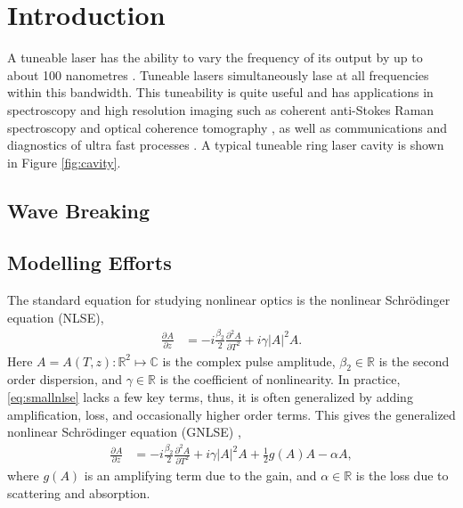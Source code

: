 \documentclass[10pt,twocolumn,a4paper]{article}
\title{}
\author{B. Metherall \and C. S. Bohun}
\newcommand{\pdiff}[3][]{\frac{\partial^{#1}#2}{\partial{#3}^{#1}}}
\begin{document}
\twocolumn[
	\begin{@twocolumnfalse}
		\maketitle
		\begin{abstract}

		\end{abstract}
	\end{@twocolumnfalse}
]

\section{Introduction}
\label{sec:intro}
A tuneable laser has the ability to vary the frequency of its output by up to about 100 nanometres \cite{bohun, burgoyne2010, yamashita}. Tuneable lasers simultaneously lase at all frequencies within this bandwidth. This tuneability is quite useful and has applications in spectroscopy and high resolution imaging such as coherent anti-Stokes Raman spectroscopy and optical coherence tomography \cite{bohun, burgoyne2014, yamashita}, as well as communications and diagnostics of ultra fast processes \cite{silfvast}. A typical tuneable ring laser cavity is shown in Figure \ref{fig:cavity}.

\subsection{Wave Breaking}

\subsection{Modelling Efforts}
\label{sec:modelling}
The standard equation for studying nonlinear optics is the nonlinear Schr\"odinger equation (NLSE),
\begin{align}
	\pdiff{A}{z} &= - i \frac{\beta_2}{2}\pdiff[2]{A}{T} + i \gamma |A|^2 A.
	\label{eq:smallnlse}
\end{align}
Here $A = A(T, z) : \mathbb{R}^2 \mapsto \mathbb{C}$ is the complex pulse amplitude, $\beta_2 \in \mathbb{R}$ is the second order dispersion, and $\gamma \in \mathbb{R}$ is the coefficient of nonlinearity. In practice, \eqref{eq:smallnlse} lacks a few key terms, thus, it is often generalized by adding amplification, loss, and occasionally higher order terms. This gives the generalized nonlinear Schr\"{o}dinger equation (GNLSE) \cite{agrawal2013, bohun, finot, peng, shtyrina, yarutkina},
	\begin{align}
	\pdiff{A}{z} &= - i \frac{\beta_2}{2}\pdiff[2]{A}{T} + i \gamma |A|^2 A + \frac{1}{2}g(A) A - \alpha A,
	\label{eq:nlse}
\end{align}
where $g(A)$ is an amplifying term due to the gain, and $\alpha \in \mathbb{R}$ is the loss due to scattering and absorption.
\end{document}
